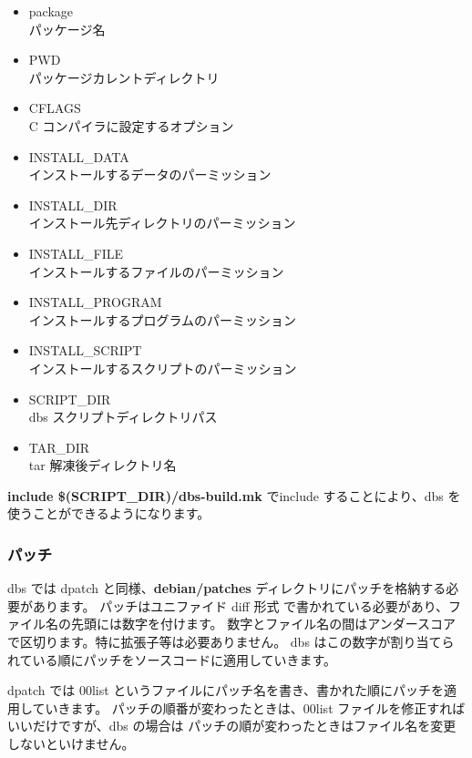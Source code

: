 \documentclass[mingoth,a4paper]{jsarticle}
\begin{document}
\begin{itemize}
\item package\\
	パッケージ名

\item PWD \\
	パッケージカレントディレクトリ

\item CFLAGS\\
	C コンパイラに設定するオプション

\item INSTALL\_DATA\\
	インストールするデータのパーミッション

\item INSTALL\_DIR\\
	インストール先ディレクトリのパーミッション 

\item INSTALL\_FILE\\
	インストールするファイルのパーミッション

\item INSTALL\_PROGRAM\\ 
	インストールするプログラムのパーミッション

\item INSTALL\_SCRIPT\\
	インストールするスクリプトのパーミッション

\item SCRIPT\_DIR\\
	dbs スクリプトディレクトリパス

\item TAR\_DIR\\
	tar 解凍後ディレクトリ名
\end{itemize}

{\bf include \$(SCRIPT\_DIR)/dbs-build.mk }でinclude することにより、dbs を使うことができるようになります。

\subsubsection{パッチ}
dbs では dpatch と同様、{\bf debian/patches} ディレクトリにパッチを格納する必要があります。
パッチはユニファイド diff 形式 で書かれている必要があり、ファイル名の先頭には数字を付けます。
数字とファイル名の間はアンダースコアで区切ります。特に拡張子等は必要ありません。
dbs はこの数字が割り当てられている順にパッチをソースコードに適用していきます。

dpatch では 00list というファイルにパッチ名を書き、書かれた順にパッチを適用していきます。
パッチの順番が変わったときは、00list ファイルを修正すればいいだけですが、dbs の場合は
パッチの順が変わったときはファイル名を変更しないといけません。
\end{document}
